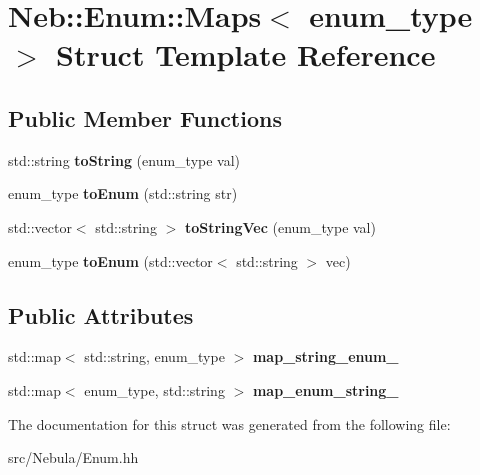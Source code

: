 \hypertarget{structNeb_1_1Enum_1_1Maps}{\section{Neb\-:\-:Enum\-:\-:Maps$<$ enum\-\_\-type $>$ Struct Template Reference}
\label{structNeb_1_1Enum_1_1Maps}
}
\subsection*{Public Member Functions}
\begin{DoxyCompactItemize}
\item 
\hypertarget{structNeb_1_1Enum_1_1Maps_ac9e855809a6118d50ca6d0b9a24f80a9}{std\-::string {\bfseries to\-String} (enum\-\_\-type val)}\label{structNeb_1_1Enum_1_1Maps_ac9e855809a6118d50ca6d0b9a24f80a9}

\item 
\hypertarget{structNeb_1_1Enum_1_1Maps_a716d4db5d843605cdf44a9687aca4779}{enum\-\_\-type {\bfseries to\-Enum} (std\-::string str)}\label{structNeb_1_1Enum_1_1Maps_a716d4db5d843605cdf44a9687aca4779}

\item 
\hypertarget{structNeb_1_1Enum_1_1Maps_af9858502b1b91eb41ff71c4d7e4fbc88}{std\-::vector$<$ std\-::string $>$ {\bfseries to\-String\-Vec} (enum\-\_\-type val)}\label{structNeb_1_1Enum_1_1Maps_af9858502b1b91eb41ff71c4d7e4fbc88}

\item 
\hypertarget{structNeb_1_1Enum_1_1Maps_a21e77595988229f4555999a0c9231432}{enum\-\_\-type {\bfseries to\-Enum} (std\-::vector$<$ std\-::string $>$ vec)}\label{structNeb_1_1Enum_1_1Maps_a21e77595988229f4555999a0c9231432}

\end{DoxyCompactItemize}
\subsection*{Public Attributes}
\begin{DoxyCompactItemize}
\item 
\hypertarget{structNeb_1_1Enum_1_1Maps_ad09edc976795064126040e7450a717e0}{std\-::map$<$ std\-::string, enum\-\_\-type $>$ {\bfseries map\-\_\-string\-\_\-enum\-\_\-}}\label{structNeb_1_1Enum_1_1Maps_ad09edc976795064126040e7450a717e0}

\item 
\hypertarget{structNeb_1_1Enum_1_1Maps_a6dadfc6e102d6a2c01a42fb91aed2bb9}{std\-::map$<$ enum\-\_\-type, std\-::string $>$ {\bfseries map\-\_\-enum\-\_\-string\-\_\-}}\label{structNeb_1_1Enum_1_1Maps_a6dadfc6e102d6a2c01a42fb91aed2bb9}

\end{DoxyCompactItemize}


The documentation for this struct was generated from the following file\-:\begin{DoxyCompactItemize}
\item 
src/\-Nebula/Enum.\-hh\end{DoxyCompactItemize}
